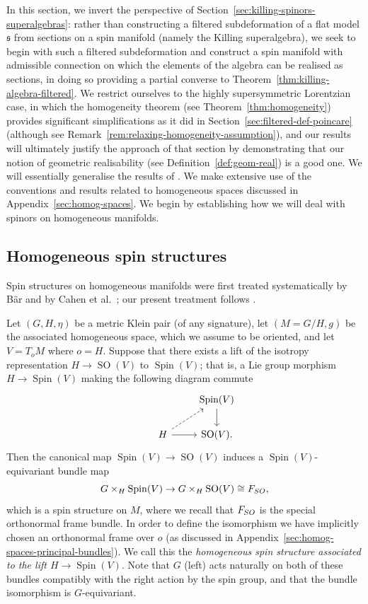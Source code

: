 \documentclass[11pt]{article}
\numberwithin{equation}{section}
\numberwithin{equation}{section}
\newcommand{\fs}{\mathfrak{s}}
\newcommand{\1}{\mathbbm{1}}
\DeclareMathOperator{\Spin}{Spin}
\DeclareMathOperator{\SO}{SO}
\begin{document}
In this section, we invert the perspective of Section~\ref{sec:killing-spinors-superalgebras}: rather than constructing a filtered subdeformation of a flat model $\fs$ from sections on a spin manifold (namely the Killing superalgebra), we seek to begin with such a filtered subdeformation and construct a spin manifold with admissible connection on which the elements of the algebra can be realised as sections, in doing so providing a partial converse to Theorem~\ref{thm:killing-algebra-filtered}. We restrict ourselves to the highly supersymmetric Lorentzian case, in which the homogeneity theorem (see Theorem~\ref{thm:homogeneity}) provides significant simplifications as it did in Section~\ref{sec:filtered-def-poincare} (although see Remark~\ref{rem:relaxing-homogeneity-assumption}), and our results will ultimately justify the approach of that section by demonstrating that our notion of geometric realisability (see Definition~\ref{def:geom-real}) is a good one. We will essentially generalise the results of \cite[Section~3.3]{Figueroa-OFarrill2017_1}. We make extensive use of the conventions and results related to homogeneous spaces discussed in Appendix~\ref{sec:homog-spaces}. We begin by establishing how we will deal with spinors on homogeneous manifolds.

\subsection{Homogeneous spin structures}
\label{sec:homogeneous-spin-mfld}

Spin structures on homogeneous manifolds were first treated systematically by B\"ar \cite{Bar1992} and by Cahen et al.\ \cite{Cahen1993}; our present treatment follows \cite{Figueroa-OFarrill2017_1}.

Let $(G,H,\eta)$ be a metric Klein pair (of any signature), let $(M=G/H,g)$ be the associated homogeneous space, which we assume to be oriented, and let $V=T_oM$ where $o=H$. Suppose that there exists a lift of the isotropy representation $H\to\SO(V)$ to $\Spin(V)$; that is, a Lie group morphism $H\to\Spin(V)$ making the following diagram commute
\[
\begin{tikzcd}
	&	& \Spin(V) \ar[d]	\\
	& H	\ar[r] \ar[ur,dashed]& \SO(V).
\end{tikzcd}
\]
Then the canonical map $\Spin(V)\to\SO(V)$ induces a $\Spin(V)$-equivariant bundle map
\[
	G\times_H\Spin(V)\to G\times_H\SO(V) \cong F_{\rm SO},
\]
which is a spin structure on $M$, where we recall that $F_{\rm SO}$ is the special orthonormal frame bundle. In order to define the isomorphism we have implicitly chosen an orthonormal frame over $o$ (as discussed in Appendix~\ref{sec:homog-spaces-principal-bundles}). We call this the \emph{homogeneous spin structure associated to the lift $H\to\Spin(V)$}. Note that $G$ (left) acts naturally on both of these bundles compatibly with the right action by the spin group, and that the bundle isomorphism is $G$-equivariant.
\end{document}
